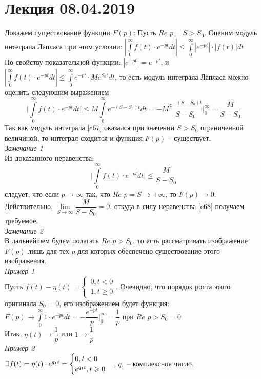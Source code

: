 \documentclass{article}
\numberwithin{equation}{section}
\def\letus{%
    \mathord{\setbox0=\hbox{$\exists$}%
             \hbox{\kern 0.125\wd0%
                   \vbox to \ht0{%
                      \hrule width 0.75\wd0%
                      \vfill%
                      \hrule width 0.75\wd0}%
                   \vrule height \ht0%
                   \kern 0.125\wd0}%
           }%
}
\begin{document}
\section{Лекция 08.04.2019}
Докажем существование функции $F(p)$: Пусть $Re$ $p=S>S_0$. Оценим модуль интеграла Лапласа при этом условии: $|\int\limits_0^\infty f(t)\cdot e^{-pt}dt|\leqslant\int\limits_0^\infty |e^{-pt}|\cdot|f(t)|dt$\\
По свойству показательной функции: $|e^{-pt}|=e^{-pt}$, и $|\int\limits_0^\infty f(t)\cdot e^{-pt}dt|\leqslant\int\limits_0^\infty e^{-pt}\cdot Me^{S_0t}dt$, то есть модуль интеграла Лапласа можно оценить следующим выражением
$$\Big|\int\limits_0^\infty f(t)\cdot e^{-pt}dt\Big|\leqslant M\int\limits_0^\infty e^{-(S-S_0)t}dt=-M\dfrac{e^{-(S-S_0)t}}{S-S_0}\Big|_0^\infty=\dfrac{M}{S-S_0}$$
Так как модуль интеграла \eqref{e67} оказался при значении $S>S_0$ ограниченной величиной, то интеграл сходится и функция $F(p)$ -- существует.\\
\textit{Замечание 1}\\
Из доказанного неравенства:
\begin{equation}\label{e68}
\Big|\int\limits_0^\infty f(t)\cdot e^{-pt}dt\Big|\leqslant\dfrac{M}{S-S_0}
\end{equation}
следует, что если $p\rightarrow\infty$ так, что $Re$ $p=S\rightarrow+\infty$, то $F(p)\rightarrow0$. Действительно, $\lim\limits_{S\rightarrow\infty}\dfrac{M}{S-S_0}=0$, откуда в силу неравенства \eqref{e68} получаем требуемое.\\
\textit{Замечание 2}\\
В дальнейшем будем полагать $Re$ $p>S_0$, то есть рассматривать изображение $F(p)$ лишь для тех $p$ для которых обеспечено существование этого изображения.\\
\textit{Пример 1}\\
Пусть $f(t)-\eta(t)=\begin{cases}
0,t<0\\
1,t\geqslant0
\end{cases}$. Очевидно, что порядок роста этого оригинала $S_0=0$, его изображением будет функция: $F(p)\rightarrow\int\limits_0^\infty1\cdot e^{-pt}dt=-\dfrac{e^{-pt}}{p}\Big|_0^\infty=\dfrac{1}{p}$ при $Re$ $p>S_0=0$\\
Итак, $\eta(t)\rightarrow\dfrac{1}{p}$ или $1\rightarrow\dfrac{1}{p}$\\
\textit{Пример 2}\\
$\letus f(t)=\eta(t)\cdot e^{q_1t}=\begin{cases}
0,t<0\\
e^{q_1t},t\geqslant0
\end{cases}$, $q_1$ -- комплексное число.\\
\end{document}
